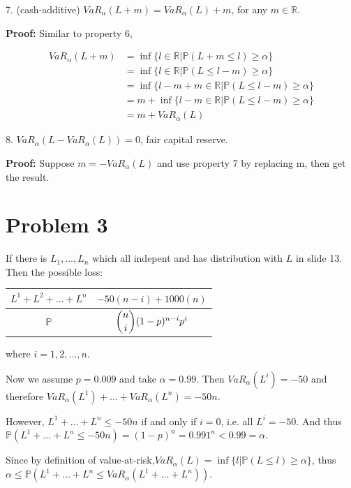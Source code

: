 \documentclass[letterpaper,11pt]{article}
\begin{document}
\begin{spacing}{1.2}
7. (cash-additive) $VaR_{\alpha}(L+m) = VaR_{\alpha}(L) + m$, for any $m \in \mathbb{R}$.

\textbf{Proof:} Similar to property 6,

\begin{equation}
\begin{aligned}
VaR_{\alpha}(L + m) &= \inf \{l \in \mathbb{R} | \mathbb{P}(L + m \le l) \ge \alpha\} \\
&= \inf \{l \in \mathbb{R} | \mathbb{P}(L \le l - m) \ge \alpha\} \\
&= \inf \{l - m + m \in \mathbb{R} | \mathbb{P}(L \le l - m) \ge \alpha\} \\
&= m + \inf \{l - m \in \mathbb{R} | \mathbb{P}(L \le l - m) \ge \alpha\} \\
&= m + VaR_{\alpha}(L)
\end{aligned}
\end{equation}

8. $VaR_{\alpha}(L - VaR_{\alpha}(L)) = 0$, fair capital reserve.

\textbf{Proof:} Suppose $m = - VaR_{\alpha}(L)$ and use property 7 by replacing m, then get the result.

\section*{Problem 3}

If there is $L_1,\ldots, L_n$ which all indepent and has distribution with $L$ in slide 13. Then the possible loss:

\begin{center}
\begin{tabular}{|c|c|}
\hline
$L^1+L^2+\ldots+L^n$&$-50(n-i)+1000(n)$\\
\hline
$\mathbb{P}$&$\dbinom{n}{i} (1-p)^{n-i}p^i$\\
\hline
\end{tabular}
\end{center}

where $i = 1, 2, \ldots, n$.

Now we assume $p=0.009$ and take $\alpha = 0.99$. Then $VaR_{\alpha}(L^i) = -50$ and therefore $VaR_{\alpha}(L^1)+\ldots+VaR_{\alpha}(L^n) = -50n$.

However, $L^1+\ldots+L^n \le -50n$ if and only if $i=0$, i.e. all $L^i = -50$. And thus $\mathbb{P}(L^1+\ldots+L^n \le -50n) = (1-p)^n = 0.991^n < 0.99 = \alpha$.

Since by definition of value-at-risk,$VaR_{\alpha}(L) = \inf \{l|\mathbb{P}(L \le l) \ge \alpha\}$, thus $\alpha \le \mathbb{P}(L^1+\ldots+L^n \le VaR_{\alpha}(L^1+\ldots+L^n))$.


\end{spacing}
\end{document}
